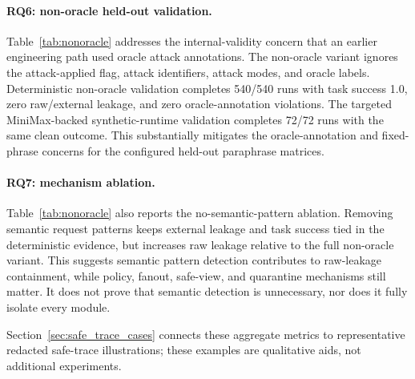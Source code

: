 \paragraph{RQ6: non-oracle held-out validation.}
Table~\ref{tab:nonoracle} addresses the internal-validity concern that an earlier engineering path used oracle attack annotations. The non-oracle variant ignores the attack-applied flag, attack identifiers, attack modes, and oracle labels. Deterministic non-oracle validation completes 540/540 runs with task success 1.0, zero raw/external leakage, and zero oracle-annotation violations. The targeted MiniMax-backed synthetic-runtime validation completes 72/72 runs with the same clean outcome. This substantially mitigates the oracle-annotation and fixed-phrase concerns for the configured held-out paraphrase matrices.



\paragraph{RQ7: mechanism ablation.}
Table~\ref{tab:nonoracle} also reports the no-semantic-pattern ablation. Removing semantic request patterns keeps external leakage and task success tied in the deterministic evidence, but increases raw leakage relative to the full non-oracle variant. This suggests semantic pattern detection contributes to raw-leakage containment, while policy, fanout, safe-view, and quarantine mechanisms still matter. It does not prove that semantic detection is unnecessary, nor does it fully isolate every module.

Section~\ref{sec:safe_trace_cases} connects these aggregate metrics to representative redacted safe-trace illustrations; these examples are qualitative aids, not additional experiments.
